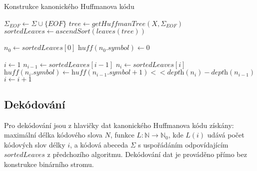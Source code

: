 \documentclass[a4paper, 11pt, fleqn]{scrartcl}
\begin{document}
        \vspace*{-1.2cm}
        \begin{algorithm}[!h]
          \SetAlgoLined
          \DontPrintSemicolon
          \caption{Konstrukce kanonického Huffmanova kódu}

          $\Sigma_{EOF} \leftarrow \Sigma \cup \{\textit{EOF}\}$\;
          $\textit{tree} \leftarrow \textit{getHuffmanTree}(X, \Sigma_{EOF})$\;
          $\textit{sortedLeaves} \leftarrow \textit{ascendSort}(\textit{leaves}(\textit{tree}))$

          $n_0 \leftarrow \textit{sortedLeaves}[0]$\;
          $\textit{huff}(n_0.symbol) \leftarrow 0$\;


          $i \leftarrow 1$\;
          {
            $n_{i-1} \leftarrow \textit{sortedLeaves}[i-1]$\;
            $n_i \leftarrow \textit{sortedLeaves}[i]$\;
            $\textit{huff}(n_i.symbol) \leftarrow \textit{huff}(n_{i-1}.symbol + 1) << \textit{depth}(n_i) - \textit{depth}(n_{i-1})$\;
            $i \leftarrow i+1$\;
          }



        \end{algorithm}

      \vspace*{-0.2cm}

      \subsection*{Dekódování}
        Pro dekódování jsou z hlavičky dat kanonického Huffmanova kódu získány: maximální délka kódového slova $N$, funkce $L: \mathbb{N} \rightarrow \mathbb{N}_0$, kde $L(i)$ udává počet kódových slov délky $i$, a kódová abeceda $\Sigma$ s uspořádáním odpovídajícím $\textit{sortedLeaves}$ z předchozího algoritmu. Dekódování dat je prováděno přímo bez konstrukce binárního stromu.
\end{document}
